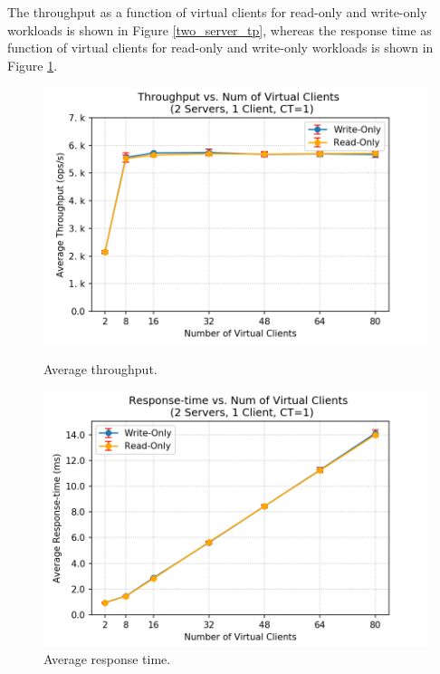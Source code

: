The throughput as a function of virtual clients for read-only and write-only workloads is shown in Figure \ref{two_server_tp}, whereas the response time as function of virtual clients for read-only and write-only workloads is shown in Figure \ref{two_server_rt}. 
\begin{figure}[H] %
   \begin{minipage}{0.48\textwidth}
     \centering
     \includegraphics[width=1\linewidth]{figures/1_BaselineWithoutMW/two_servers/two_servers_mem_tp_2018-12-06_10h49.png}
     \caption{Average throughput.}\label{two_server_tp}
   \end{minipage}\hfill
   \begin{minipage}{0.48\textwidth}
     \centering
     \includegraphics[width=1\linewidth]{figures/1_BaselineWithoutMW/two_servers/two_servers_mem_rt_2018-12-06_10h49.png}
     \caption{Average response time.}\label{two_server_rt}
   \end{minipage}
\end{figure}

